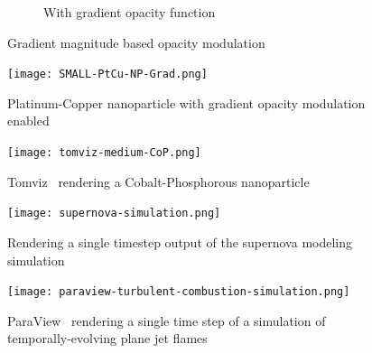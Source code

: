 \begin{figure}[htb]
\begin{subfigure}[b]{0.5\columnwidth}
    \caption{With gradient opacity function}
    \label{fig:Ng2}
  \end{subfigure}
  \caption{Gradient magnitude based opacity modulation}
  \label{fig:gradient}
\end{figure}

\begin{figure}[htb]
  \centering
  \texttt{[image: SMALL-PtCu-NP-Grad.png]}
  \caption{Platinum-Copper nanoparticle with gradient opacity modulation enabled}
  \label{fig:ptcu-grad}
\end{figure}

\begin{figure}[htb]
  \centering
  \texttt{[image: tomviz-medium-CoP.png]}
  \caption{Tomviz~\protect\citep{marcus_hanwell_tomviz_2014} rendering a
  Cobalt-Phosphorous nanoparticle}
  \label{fig:tomviz-cop}
\end{figure}

\begin{figure}[htb]
  \centering
  \texttt{[image: supernova-simulation.png]}
  \caption{Rendering a single timestep output of the supernova modeling
  simulation}
  \label{fig:supernova}
\end{figure}

\begin{figure}[htb]
  \centering
  \texttt{[image: paraview-turbulent-combustion-simulation.png]}
  \caption{ParaView~\protect\citep{ahrens_paraview:_2005, ayachit_paraview_2015,
  ayachit_paraview_2015-1} rendering a single time step of a simulation of
  temporally-evolving plane jet
  flames~\protect\citep{hiroshi_akiba_visualizing_2007}}
  \label{fig:paraview-turbulent-combustion}
\end{figure}
